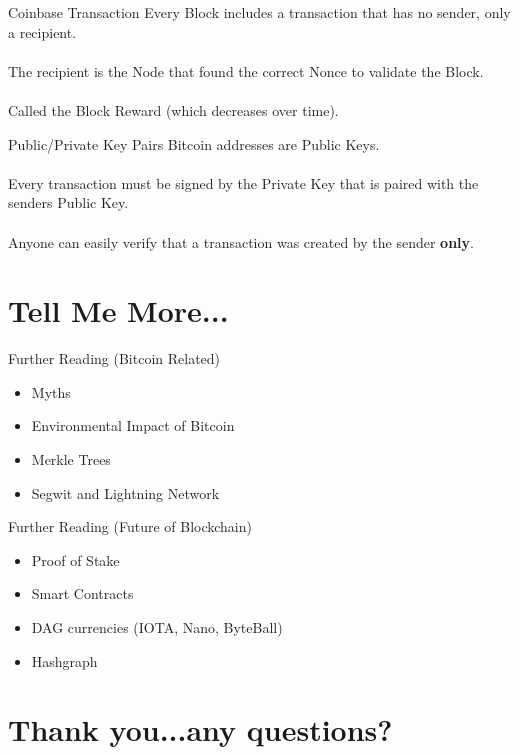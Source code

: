 \documentclass{beamer}
\begin{document}
\begin{frame}{Coinbase Transaction}
Every Block includes a transaction that has \alert{no sender}, only a recipient.\pause
\\
\\
The recipient is the Node that found the correct Nonce to validate the Block.\pause
\\
\\
Called the Block Reward (which decreases over time).
\end{frame}


\begin{frame}{Public/Private Key Pairs}
Bitcoin addresses are \alert{Public Keys}.\\
\\ \pause
Every transaction must be signed by the \alert{Private Key} that is paired with the senders \alert{Public Key}.\\
\\ \pause
Anyone can easily verify that a transaction was created by the sender \textbf{only}.
\end{frame}


\section{Tell Me More...}


\begin{frame}{Further Reading (Bitcoin Related)}
\begin{itemize}
  \item Myths \cite{Kikvadze_2018,Top_10_Myths_About_Bitcoin_2016}
  \item Environmental Impact of Bitcoin \cite{Buntix,Ou_2017,steembusiness_2017,Kobie}
  \item Merkle Trees \cite{Ray_2017,Merkle}
  \item Segwit and Lightning Network \cite{Investopedia_2017,Lee_2017,Wirdum,Waee_Digital_Ltd}
\end{itemize}
\end{frame}


\begin{frame}{Further Reading (Future of Blockchain)}
\begin{itemize}
  \item Proof of Stake \cite{Investopedia_2017b,Rosic_2017}
  \item Smart Contracts \cite{frozeman_vbuterin_chriseth_debris_2018,K_2017}
  \item DAG currencies (IOTA, Nano, ByteBall) \cite{Ryszkiewicz,jimmco_2017,Popov_2017}
  \item Hashgraph \cite{Baird_2016,Samman}

\end{itemize}
\end{frame}

\section{Thank you...any questions?}


\begin{frame}[allowframebreaks]
  \printbibliography
\end{frame}
\end{document}

